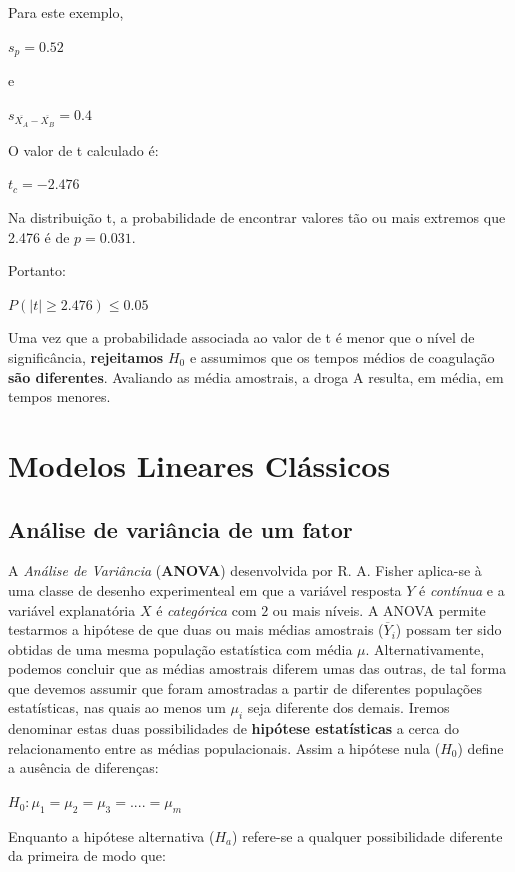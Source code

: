 \documentclass[
]{book}
\begin{document}
Para este exemplo,

\(s_p = 0.52\)

e

\(s_{\overline{X_A}-\overline{X_B}} = 0.4\)

O valor de t calculado é:

\(t_c = -2.476\)

Na distribuição t, a probabilidade de encontrar valores tão ou mais extremos que 2.476 é de \(p = 0.031\).

Portanto:

\(P(|t| \ge 2.476) \le 0.05\)

Uma vez que a probabilidade associada ao valor de t é menor que o nível de significância, \textbf{rejeitamos} \(H_0\) e assumimos que os tempos médios de coagulação \textbf{são diferentes}. Avaliando as média amostrais, a droga A resulta, em média, em tempos menores.

\hypertarget{part-modelos-lineares-cluxe1ssicos}{%
\part{Modelos Lineares Clássicos}\label{part-modelos-lineares-cluxe1ssicos}}

\hypertarget{anova}{%
\chapter{Análise de variância de um fator}\label{anova}}

A \emph{Análise de Variância} (\textbf{ANOVA}) desenvolvida por R. A. Fisher aplica-se à uma classe de desenho experimenteal em que a variável resposta \(Y\) é \emph{contínua} e a variável explanatória \(X\) é \emph{categórica} com \(2\) ou mais níveis. A ANOVA permite testarmos a hipótese de que duas ou mais médias amostrais (\(\overline{Y}_i\)) possam ter sido obtidas de uma mesma população estatística com média \(\mu\). Alternativamente, podemos concluir que as médias amostrais diferem umas das outras, de tal forma que devemos assumir que foram amostradas a partir de diferentes populações estatísticas, nas quais ao menos um \(\mu_i\) seja diferente dos demais. Iremos denominar estas duas possibilidades de \textbf{hipótese estatísticas} a cerca do relacionamento entre as médias populacionais. Assim a hipótese nula (\(H_0\)) define a ausência de diferenças:

\(H_0: \mu_1 = \mu_2 = \mu_3 =.... = \mu_m\)

Enquanto a hipótese alternativa (\(H_a\)) refere-se a qualquer possibilidade diferente da primeira de modo que:
\end{document}
